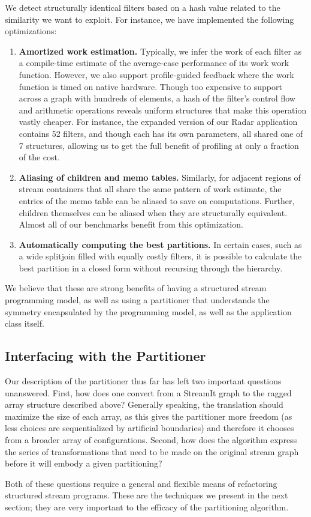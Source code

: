 We detect structurally identical filters based on a hash value related
to the similarity we want to exploit.  For instance, we have
implemented the following optimizations:
\begin{enumerate}

\item {\bf Amortized work estimation.}  Typically, we infer the work
of each filter as a compile-time estimate of the average-case
performance of its work work function.  However, we also support
profile-guided feedback where the work function is timed on native
hardware.  Though too expensive to support across a graph with
hundreds of elements, a hash of the filter's control flow and
arithmetic operations reveals uniform structures that make this
operation vastly cheaper.  For instance, the expanded version of our
Radar application contains 52 filters, and though each has its own
parameters, all shared one of 7 structures, allowing us to get the
full benefit of profiling at only a fraction of the cost.

\item {\bf Aliasing of children and memo tables.}  Similarly, for
adjacent regions of stream containers that all share the same pattern
of work estimate, the entries of the memo table can be aliased to save
on computations.  Further, children themselves can be aliased when
they are structurally equivalent.  Almost all of our benchmarks
benefit from this optimization.

\item {\bf Automatically computing the best partitions.}  In certain
cases, such as a wide splitjoin filled with equally costly filters, it
is possible to calculate the best partition in a closed form without
recursing through the hierarchy.
\end{enumerate}

We believe that these are strong benefits of having a structured
stream programming model, as well as using a partitioner that
understands the symmetry encapsulated by the programming model, as
well as the application class itself.

\subsection{Interfacing with the Partitioner}

Our description of the partitioner thus far has left two important
questions unanswered.  First, how does one convert from a StreamIt
graph to the ragged array structure described above?  Generally
speaking, the translation should maximize the size of each array, as
this gives the partitioner more freedom (as less choices are
sequentialized by artificial boundaries) and therefore it chooses from
a broader array of configurations.  Second, how does the algorithm
express the series of transformations that need to be made on the
original stream graph before it will embody a given partitioning?

Both of these questions require a general and flexible means of
refactoring structured stream programs.  These are the techniques we
present in the next section; they are very important to the efficacy
of the partitioning algorithm.

